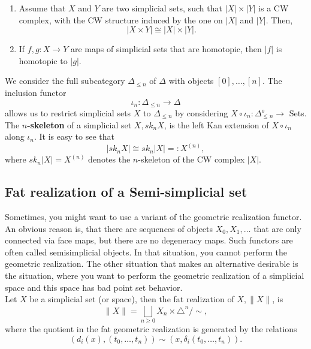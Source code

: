 \begin{prop}
    \begin{enumerate}
        \item Assume that $X$ and $Y$ are two simplicial sets, such that $|X| \times|Y|$ is a CW complex, with the CW structure induced by the one on $|X|$ and $|Y|$. Then,
        $$
        |X \times Y| \cong|X| \times|Y| \text {. }
        $$
        \item If $f, g: X \rightarrow Y$ are maps of simplicial sets that are homotopic, then $|f|$ is homotopic to $|g|$.
    \end{enumerate}
\end{prop}

We consider the full subcategory $\Delta_{\leq n}$ of $\Delta$ with objects $[0], \ldots,[n]$. The inclusion functor
$$
\iota_n: \Delta_{\leq n} \rightarrow \Delta
$$
allows us to restrict simplicial sets $X$ to $\Delta_{\leq n}$ by considering $X \circ \iota_n: \Delta_{\leq n}^o \rightarrow$ Sets.
The \textbf{$n$-skeleton} of a simplicial set $X, s k_n X$, is the left Kan extension of $X \circ \iota_n$ along $\iota_n$.
It is easy to see that 
$$
\left|s k_n X\right| \cong s k_n|X|=: X^{(n)},
$$
where $s k_n|X|=X^{(n)}$ denotes the $n$-skeleton of the CW complex $|X|$.

\subsection*{Fat realization of a Semi-simplicial set}

Sometimes, you might want to use a variant of the geometric realization functor. An obvious reason is, that there are sequences of objects $X_0, X_1, \ldots$ that are only connected via face maps, but there are no degeneracy maps. Such functors are often called semisimplicial objects. In that situation, you cannot perform the geometric realization. The other situation that makes an alternative desirable is the situation, where you want to perform the geometric realization of a simplicial space and this space has bad point set behavior.\\

Let $X$ be a simplicial set (or space), then the fat realization of $X,\|X\|$, is
$$
\|X\|=\bigsqcup_{n \geq 0} X_n \times \triangle^n / \sim,
$$
where the quotient in the fat geometric realization is generated by the relations
$$
\left(d_i(x),\left(t_0, \ldots, t_n\right)\right) \sim\left(x, \delta_i\left(t_0, \ldots, t_n\right)\right) .
$$

